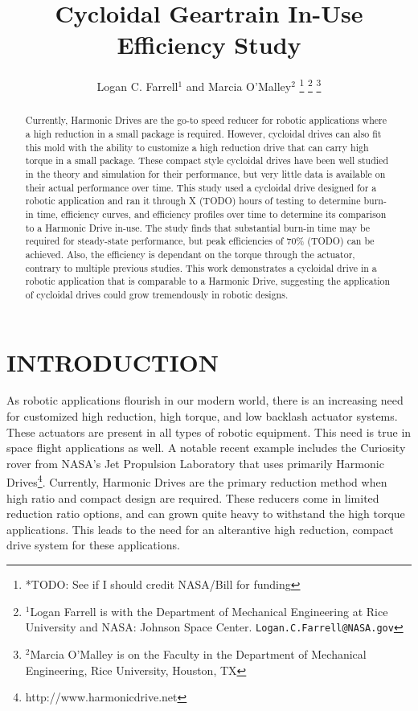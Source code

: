\documentclass[letterpaper, 10 pt, conference]{ieeeconf}  %
\title{\LARGE \bf
Cycloidal Geartrain In-Use Efficiency Study
}
\author{Logan C. Farrell$^{1}$ and Marcia O'Malley$^{2}$%
\thanks{*TODO: See if I should credit NASA/Bill for funding }%
\thanks{$^{1}$Logan Farrell is with the Department of Mechanical Engineering at Rice University and NASA: Johnson Space Center.
        {\tt\small Logan.C.Farrell@NASA.gov}}%
\thanks{$^{2}$Marcia O'Malley is on the Faculty in the Department of Mechanical Engineering, Rice University, Houston, TX}%
}
\begin{document}
\maketitle
\thispagestyle{empty}
\pagestyle{empty}


\begin{abstract}

Currently, Harmonic Drives are the go-to speed reducer for robotic applications where a high reduction in a small package is required. However, cycloidal drives can also fit this mold with the ability to customize a high reduction drive that can carry high torque in a small package. These compact style cycloidal drives have been well studied in the theory and simulation for their performance, but very little data is available on their actual performance over time. This study used a cycloidal drive designed for a robotic application and ran it through X (TODO) hours of testing to determine burn-in time, efficiency curves, and efficiency profiles over time to determine its comparison to a Harmonic Drive in-use. The study finds that substantial burn-in time may be required for steady-state performance, but peak efficiencies of 70\% (TODO) can be achieved. Also, the efficiency is dependant on the torque through the actuator, contrary to multiple previous studies. This work demonstrates a cycloidal drive in a robotic application that is comparable to a Harmonic Drive, suggesting the application of cycloidal drives could grow tremendously in robotic designs. 

\end{abstract}


\section{INTRODUCTION}
As robotic applications flourish in our modern world, there is an increasing need for customized high reduction, high torque, and low backlash actuator systems. These actuators are present in all types of robotic equipment. This need is true in space flight applications as well. A notable recent example includes the Curiosity rover from NASA's Jet Propulsion Laboratory \cite{curiosity} that uses primarily Harmonic Drives\footnote{http://www.harmonicdrive.net}. Currently, Harmonic Drives are the primary reduction method when high ratio and compact design are required. These reducers come in limited reduction ratio options, and can grown quite heavy to withstand the high torque applications. This leads to the need for an alterantive high reduction, compact drive system for these applications. 
\end{document}
